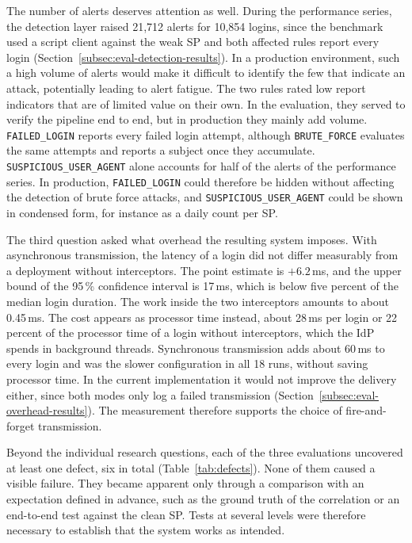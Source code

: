\documentclass[../main.tex]{subfiles}
\begin{document}
The number of alerts deserves attention as well. 
During the performance series, the detection layer raised 21{,}712 alerts for 10{,}854 logins, 
since the benchmark used a script client against the weak SP and both affected rules report every 
login (Section~\ref{subsec:eval-detection-results}). 
In a production environment, such a high volume of alerts would make it difficult to identify the few 
that indicate an attack, potentially leading to alert fatigue. 
The two rules rated low report indicators that are of limited value on their own. 
In the evaluation, they served to verify the pipeline end to end, but in production they mainly add 
volume. 
\texttt{FAILED\_\allowbreak{}LOGIN} reports every failed login attempt, although 
\texttt{BRUTE\_\allowbreak{}FORCE} evaluates the same attempts and reports a subject once they 
accumulate. 
\texttt{SUSPICIOUS\_\allowbreak{}USER\_\allowbreak{}AGENT} alone accounts for half of the alerts of 
the performance series. 
In production, \texttt{FAILED\_\allowbreak{}LOGIN} could therefore be hidden without affecting the 
detection of brute force attacks, and \texttt{SUSPICIOUS\_\allowbreak{}USER\_\allowbreak{}AGENT} 
could be shown in condensed form, for instance as a daily count per SP. 

The third question asked what overhead the resulting system imposes. 
With asynchronous transmission, the latency of a login did not differ measurably from a deployment 
without interceptors. 
The point estimate is $+6.2$\,ms, and the upper bound of the 95\,\% confidence interval is 17\,ms, 
which is below five percent of the median login duration. 
The work inside the two interceptors amounts to about 0.45\,ms. 
The cost appears as processor time instead, about 28\,ms per login or 22 percent of the processor 
time of a login without interceptors, which the IdP spends in background threads. 
Synchronous transmission adds about 60\,ms to every login and was the slower configuration in all 
18 runs, without saving processor time. 
In the current implementation it would not improve the delivery either, since both modes only log 
a failed transmission (Section~\ref{subsec:eval-overhead-results}). 
The measurement therefore supports the choice of fire-and-forget transmission. 

Beyond the individual research questions, each of the three evaluations uncovered at least one 
defect, six in total (Table~\ref{tab:defects}). 
None of them caused a visible failure. 
They became apparent only through a comparison with an expectation defined in advance, such as the 
ground truth of the correlation or an end-to-end test against the clean SP. 
Tests at several levels were therefore necessary to establish that the system works as intended. 
\end{document}
